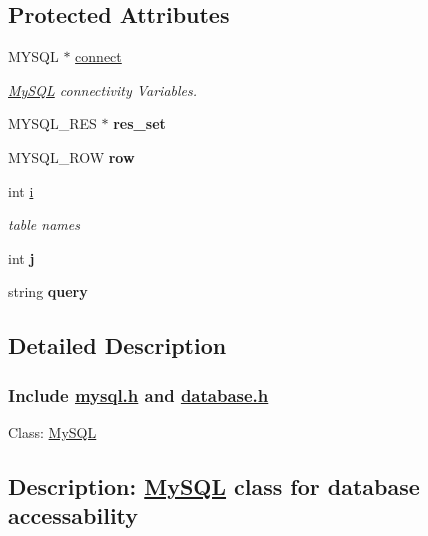 \subsection*{Protected Attributes}
\begin{DoxyCompactItemize}
\item 
M\-Y\-S\-Q\-L $\ast$ \hyperlink{classMySQL_a56a2a9159f6d46d8b3bd648e1f08e2b1}{connect}
\begin{DoxyCompactList}\small\item\em \hyperlink{classMySQL}{My\-S\-Q\-L} connectivity Variables. \end{DoxyCompactList}\item 
\hypertarget{classMySQL_abfe0a8f3fe7af0a582be5882f0afe69d}{M\-Y\-S\-Q\-L\-\_\-\-R\-E\-S $\ast$ {\bfseries res\-\_\-set}}\label{classMySQL_abfe0a8f3fe7af0a582be5882f0afe69d}

\item 
\hypertarget{classMySQL_a56c73e3942ca040f13164e957a41a340}{M\-Y\-S\-Q\-L\-\_\-\-R\-O\-W {\bfseries row}}\label{classMySQL_a56c73e3942ca040f13164e957a41a340}

\item 
int \hyperlink{classMySQL_ae461697dbdebb43334caa98e80bd5526}{i}
\begin{DoxyCompactList}\small\item\em table names \end{DoxyCompactList}\item 
\hypertarget{classMySQL_a565d31fcec8437c21f08e7ca008cb2b6}{int {\bfseries j}}\label{classMySQL_a565d31fcec8437c21f08e7ca008cb2b6}

\item 
\hypertarget{classMySQL_ae709a2ac6d1bd455c31077fe760f3cb7}{string {\bfseries query}}\label{classMySQL_ae709a2ac6d1bd455c31077fe760f3cb7}

\end{DoxyCompactItemize}


\subsection{Detailed Description}


 \subsubsection*{Include \hyperlink{mysql_8h_source}{mysql.\-h} and \hyperlink{database_8h_source}{database.\-h}}



 Class\-: \hyperlink{classMySQL}{My\-S\-Q\-L} \subsection*{Description\-: \hyperlink{classMySQL}{My\-S\-Q\-L} class for database accessability}

